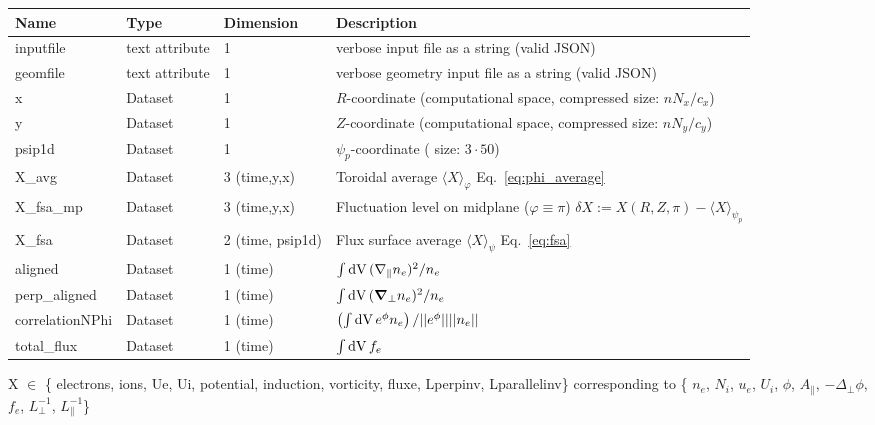 \begin{longtable}{lll>{\RaggedRight}p{7cm}}
\toprule
\rowcolor{gray!50}\textbf{Name} &  \textbf{Type} & \textbf{Dimension} & \textbf{Description}  \\ \midrule
inputfile  &     text attribute & 1 & verbose input file as a string (valid JSON) \\
geomfile   &     text attribute & 1 & verbose geometry input file as a string (valid JSON) \\
x                & Dataset & 1 & $R$-coordinate (computational space, compressed size: $nN_x/c_x$)\\
y                & Dataset & 1 & $Z$-coordinate (computational space, compressed size: $nN_y/c_y$)\\
psip1d           & Dataset & 1 & $\psi_p$-coordinate ( size: $3\cdot 50$) \\
X\_avg           & Dataset & 3 (time,y,x) & Toroidal average $\langle X
    \rangle_\varphi$ Eq.~\eqref{eq:phi_average} \\
X\_fsa\_mp       & Dataset & 3 (time,y,x) & Fluctuation level on midplane ($\varphi\equiv \pi$) $\delta X := X(R,Z,\pi) - \langle X\rangle_{\psi_{p}}$ \\
X\_fsa           & Dataset & 2 (time, psip1d) & Flux surface average $\langle X\rangle_\psi$ Eq.~\eqref{eq:fsa} \\
aligned          & Dataset & 1 (time) & $\int \mathrm{dV}\, (\nabla_\parallel n_e)^2 /n_e$ \\
perp\_aligned    & Dataset & 1 (time) & $\int \mathrm{dV}\, ({\boldsymbol{\nabla}}_\perp n_e)^2 /n_e$ \\
correlationNPhi  & Dataset & 1 (time) & $\left( \int\mathrm{dV}\, e^\phi n_e \right)/ ||e^\phi||||n_e||$\\
total\_flux      & Dataset & 1 (time) & $\int \mathrm{dV}\, f_e$\\
\bottomrule
\end{longtable}
X $\in$ \{ electrons, ions, Ue, Ui, potential,
induction, vorticity, fluxe, Lperpinv, Lparallelinv\} corresponding to \{
    $n_e$, $N_i$, $u_e$, $U_i$, $\phi$, $A_\parallel$, $-\Delta_\perp \phi$,
    $f_e$, $L_\perp^{-1}$, $L_\parallel^{-1}$\}










